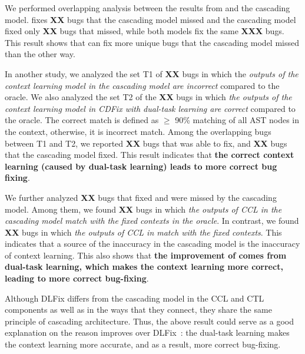 We performed overlapping analysis between the results
from {\tool} and the cascading model. {\tool} fixes {\bf XX} bugs that
the cascading model missed and the cascading model fixed only {\bf XX}
bugs that {\tool} missed, while both models fix the same {\bf XXX}
bugs. This result shows that {\tool} can fix more unique bugs
that the cascading model missed than the other way.

In another study, we analyzed the set T1 of {\bf XX} bugs in which the
{\em outputs of the context learning model in the cascading model are
  incorrect} compared to the oracle. We also analyzed the set T2 of
the {\bf XX} bugs in which {\em the outputs of the context learning
  model in CDFix with dual-task learning are correct} compared to the
oracle. The correct match is defined as $\geq$ 90\% matching of all AST
nodes in the context, otherwise, it is incorrect match.
%
Among the overlapping bugs between T1 and T2, we reported {\bf XX}
bugs that {\tool} was able to fix, and {\bf XX} bugs that the
cascading model fixed.  This result indicates that {\bf the correct context
learning (caused by dual-task learning) leads to more correct bug
fixing}.

We further analyzed {\bf XX} bugs that {\tool} fixed and were missed
by the cascading model. Among them, we found {\bf XX} bugs in which
{\em the outputs of CCL in the cascading model match with the fixed
  contexts in the oracle}. In contrast, we found {\bf XX} bugs in
which {\em the outputs of CCL in {\tool} match with the fixed
  contexts}. This indicates that a source of the inaccuracy in the
cascading model is the inaccuracy of context learning. This also shows
that {\bf the improvement of {\tool} comes from dual-task learning,
  which makes the context learning more correct, leading to more
  correct bug-fixing}.





Although DLFix differs from the cascading model in the CCL and CTL
components as well as in the ways that they connect, they share the
same principle of cascading architecture. Thus, the above result could
serve as a good explanation on the reason {\tool} improves over
DLFix~\cite{icse20}: the dual-task learning makes the context learning
more accurate, and as a result, more correct bug-fixing.

